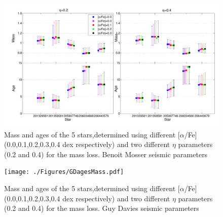 \documentclass{aa}
\begin{document}
%
%


{}

\begin{appendix}

    





\begin{figure}
\centering
\includegraphics[width=1.7\columnwidth]{./Figures/Benoit.pdf}
\caption{Mass and ages of the 5 stars,determined using different [$\alpha$/Fe] (0.0,0.1,0.2,0.3,0.4 dex respectively) and two different $\eta$ parameters (0.2 and 0.4) for the mass loss. Benoit Mosser seismic parameters}
\label{Fig:agesBenoit}%
\end{figure}


\begin{figure}
\centering
\texttt{[image: ./Figures/GDagesMass.pdf]}
\caption{Mass and ages of the 5 stars,determined using different [$\alpha$/Fe] (0.0,0.1,0.2,0.3,0.4 dex respectively) and two different $\eta$ parameters (0.2 and 0.4) for the mass loss. Guy Davies seismic parameters}
\label{Fig:agesGuy}%
\end{figure}


\end{appendix}
\end{document}
